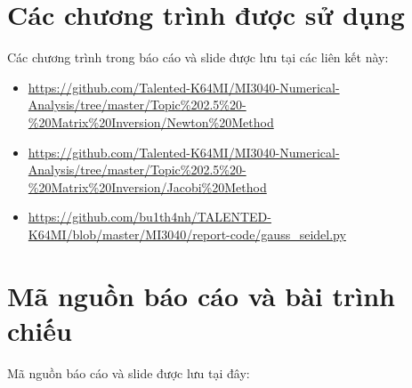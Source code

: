 \newpage
\appendix
\addappheadtotoc
\renewcommand{\thesection}{\Alph{section}}
\section{Các chương trình được sử dụng}
    \par Các chương trình trong báo cáo và slide được lưu tại các liên kết này:
    \begin{itemize}
        \item \url{https://github.com/Talented-K64MI/MI3040-Numerical-Analysis/tree/master/Topic%202.5%20-%20Matrix%20Inversion/Newton%20Method}
        \item \url{https://github.com/Talented-K64MI/MI3040-Numerical-Analysis/tree/master/Topic%202.5%20-%20Matrix%20Inversion/Jacobi%20Method}
        \item \url{https://github.com/bu1th4nh/TALENTED-K64MI/blob/master/MI3040/report-code/gauss_seidel.py} 
    \end{itemize}

\section{Mã nguồn báo cáo và bài trình chiếu}
    \par Mã nguồn báo cáo và slide được lưu tại đây: 


